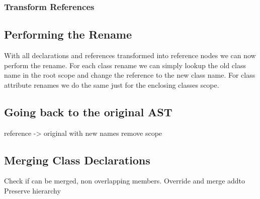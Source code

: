 \subsubsection{Transform References}

\subsection{Performing the Rename}\label{subsec:performing-the-rename}

With all declarations and references transformed into reference nodes we can now perform the rename.
For each class rename we can simply lookup the old class name in the root scope and change the reference to the new class name.
For class attribute renames we do the same just for the enclosing classes scope.

\subsection{Going back to the original AST}\label{subsec:going-back-to-the-original-ast}

reference -> original with new names
remove scope

\subsection{Merging Class Declarations}\label{subsec:merging-class-declarations}

Check if can be merged, non overlapping members.
Override and merge addto
Preserve hierarchy